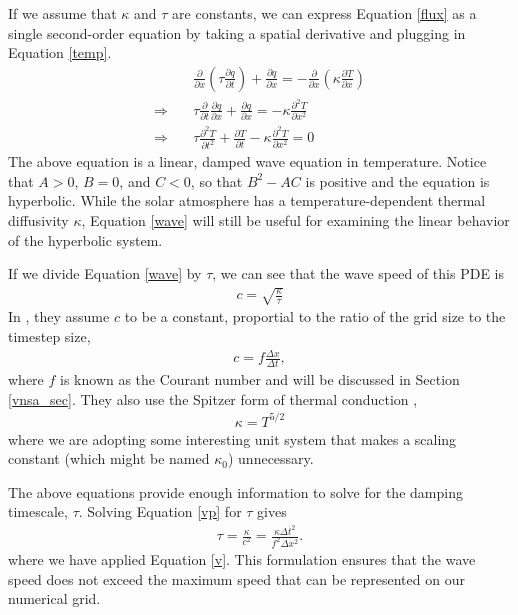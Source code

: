 \documentclass[iop]{emulateapj}
\begin{document}
				If we assume that $\kappa$ and $\tau$ are constants, we can express Equation \ref{flux} as a single second-order equation by taking a spatial derivative and plugging in Equation \ref{temp}.
				\begin{align}
					& \frac{\partial}{\partial x} \left( \tau \frac{\partial q}{\partial t} \right) + \frac{\partial q}{\partial x} = - \frac{\partial}{\partial x} \left( \kappa \frac{\partial T}{\partial x} \right) \\
					\Rightarrow \quad & \tau \frac{\partial}{\partial t} \frac{\partial q}{\partial x} + \frac{\partial q}{\partial x} = -\kappa \frac{\partial^2 T}{\partial x^2} \\
					\Rightarrow \quad & \tau \frac{\partial^2 T}{\partial t^2} +  \frac{\partial T}{\partial t} - \kappa \frac{\partial^2 T}{\partial x^2} = 0 \label{wave}
				\end{align}
				The above equation is a linear, damped wave equation in temperature. Notice that $A > 0$, $B = 0$, and $C < 0$, so that $B^2 - A C$ is positive and the equation is hyperbolic.	
				While the solar atmosphere has a temperature-dependent thermal diffusivity $\kappa$, Equation \ref{wave} will still be useful for examining the linear behavior of the hyperbolic system.
		
				If we divide Equation \ref{wave} by $\tau$, we can see that the wave speed of this PDE is 
				\begin{align}
					c = \sqrt{\frac{\kappa}{\tau}} \label{vp}
				\end{align}
				In \cite{A}, they assume $c$ to be a constant, proportial to the ratio of the grid size to the timestep size,
				\begin{align}
					c = f \frac{\Delta x}{\Delta t} \label{v},
				\end{align}
				where $f$ is known as the Courant number and will be discussed in Section \ref{vnsa_sec}.
				They also use the Spitzer form of thermal conduction \citep{spitzer_62}, 
				\begin{align}
					\kappa = T^{5/2}
				\end{align}
				where we are adopting some interesting unit system that makes a scaling constant (which might be named $\kappa_0$) unnecessary.
				
				The above equations provide enough information to solve for the damping timescale, $\tau$. Solving Equation \ref{vp} for $\tau$ gives
				\begin{align}
					\tau = \frac{\kappa}{c^2} = \frac{\kappa \Delta t^2}{f^2 \Delta x^2}.
				\end{align}
				where we have applied Equation \ref{v}. 
				This formulation ensures that the wave speed does not exceed the maximum speed that can be represented on our numerical grid.
				
\end{document}
